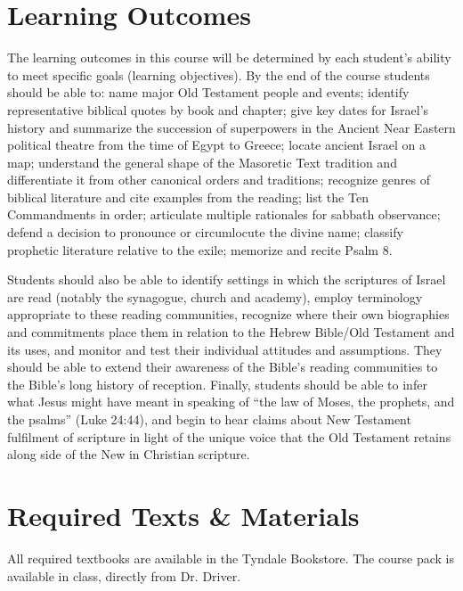\documentclass[titlepage]{article}
\newcommand\incl{../includes}
\begin{document}


\section{Learning Outcomes}
\label{outcomes}

The learning outcomes in this course will be determined by each
student's ability to meet specific goals (learning objectives). By the
end of the course students should be able to:
  name major Old Testament people and events;
  identify representative biblical quotes by book and chapter;
  give key dates for Israel's history and summarize the succession of
    superpowers in the Ancient Near Eastern political theatre from the
    time of Egypt to Greece;
  locate ancient Israel on a map;
  understand the general shape of the Masoretic Text tradition and
    differentiate it from other canonical orders and traditions;
  recognize genres of biblical literature and cite examples from the
    reading;
  list the Ten Commandments in order;
  articulate multiple rationales for sabbath observance;
  defend a decision to pronounce or circumlocute the divine name;
  classify prophetic literature relative to the exile;
  memorize and recite Psalm 8.

Students should also be able to identify settings in which the
scriptures of Israel are read (notably the synagogue, church and
academy), employ terminology appropriate to these reading communities,
recognize where their own biographies and commitments place them in
relation to the Hebrew Bible/Old Testament and its uses, and monitor and
test their individual attitudes and assumptions. They should be able
to extend their awareness of the Bible's reading communities to the
Bible's long history of reception. Finally, students should be able to
infer what Jesus might have meant in speaking of ``the law of Moses, the
prophets, and the psalms'' (Luke 24:44), and begin to hear claims about
New Testament fulfilment of scripture in light of the unique voice that
the Old Testament retains along side of the New in Christian scripture.

\section{Required Texts \& Materials}
\label{texts}

All required textbooks are available in the Tyndale Bookstore. The
course pack is available in class, directly from Dr. Driver.
\end{document}
